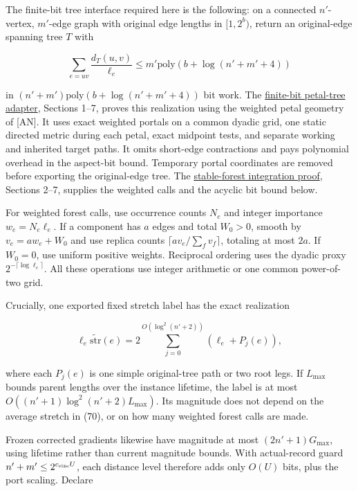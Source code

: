 The finite-bit tree interface required here is the following: on a connected \(n'\)-vertex, \(m'\)-edge graph with original edge lengths in \([1,2^b)\), return an original-edge spanning tree \(T\) with

\[
\sum_{e=uv}\frac{d_T(u,v)}{\ell_e}\leq
       m'\mathrm{poly}(b+\log(n'+m'+4))
 \tag{70}
\]

in \((n'+m')\mathrm{poly}(b+\log(n'+m'+4))\) bit work. The \href{https://github.com/icekylinx/algorithm-frontier/blob/main/manuscripts/graph-backends/an-weighted-finite-bit-adapter.md}{finite-bit petal-tree adapter}, Sections 1--7, proves this realization using the weighted petal geometry of {[}AN{]}. It uses exact weighted portals on a common dyadic grid, one static directed metric during each petal, exact midpoint tests, and separate working and inherited target paths. It omits short-edge contractions and pays polynomial overhead in the aspect-bit bound. Temporary portal coordinates are removed before exporting the original-edge tree. The \href{https://github.com/icekylinx/algorithm-frontier/blob/main/manuscripts/graph-backends/polynomial-bit-stretch-stable-forest-integration.md}{stable-forest integration proof}, Sections 2--7, supplies the weighted calls and the acyclic bit bound below.

For weighted forest calls, use occurrence counts \(N_e\) and integer importance \(w_e=N_e\ell_e\). If a component has \(a\) edges and total \(W_0>0\), smooth by \(v_e=aw_e+W_0\) and use replica counts \(\lceil av_e/\sum_fv_f\rceil\), totaling at most \(2a\). If \(W_0=0\), use uniform positive weights. Reciprocal ordering uses the dyadic proxy \(2^{-\lceil\log\ell_e\rceil}\). All these operations use integer arithmetic or one common power-of-two grid.

Crucially, one exported fixed stretch label has the exact realization

\[
\ell_e\widetilde{\mathrm{str}}(e)
       =2\sum_{j=0}^{O(\log^2(n'+2))}(\ell_e+P_j(e)),
 \tag{71}
\]

where each \(P_j(e)\) is one simple original-tree path or two root legs. If \(L_{\max}\) bounds parent lengths over the instance lifetime, the label is at most \(O((n'+1)\log^2(n'+2)L_{\max})\). Its magnitude does not depend on the average stretch in (70), or on how many weighted forest calls are made.

Frozen corrected gradients likewise have magnitude at most \((2n'+1)G_{\max}\), using lifetime rather than current magnitude bounds. With actual-record guard \(n'+m'\leq2^{c_{\rm size}U}\), each distance level therefore adds only \(O(U)\) bits, plus the port scaling. Declare

